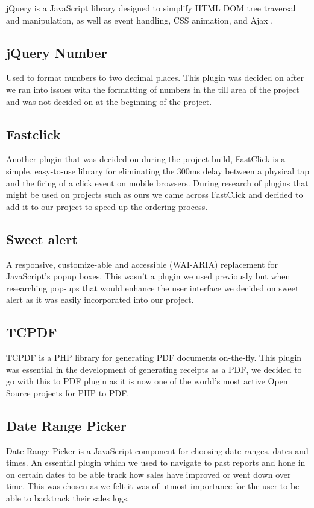 jQuery is a JavaScript library designed to simplify HTML DOM tree traversal and manipulation, as well as event handling, CSS animation, and Ajax \cite{JQ}. 
\subsection{jQuery Number}

Used to format numbers to two decimal places. This plugin was decided on after we ran into issues with the formatting of numbers in the till area of the project and was not decided on at the beginning of the project.

\subsection{Fastclick}

Another plugin that was decided on during the project build, FastClick is a simple, easy-to-use library for eliminating the 300ms delay between a physical tap and the firing of a click event on mobile browsers. During research of plugins that might be used on projects such as ours we came across FastClick and decided to add it to our project to speed up the ordering process.

\subsection{Sweet alert}

A responsive, customize-able and accessible (WAI-ARIA) replacement for JavaScript's popup boxes. This wasn’t a plugin we used previously but when researching pop-ups that would enhance the user interface we decided on sweet alert as it was easily incorporated into our project.

\subsection{TCPDF}

TCPDF is a PHP library for generating PDF documents on-the-fly. This plugin was essential in the development of generating receipts as a PDF, we decided to go with this to PDF plugin as it is now one of the world's most active Open Source projects for PHP to PDF.

\subsection{Date Range Picker}

Date Range Picker is a JavaScript component for choosing date ranges, dates and times. An essential plugin which we used to navigate to past reports and hone in on certain dates to be able track how sales have improved or went down over time. This was chosen as we felt it was of utmost importance for the user to be able to backtrack their sales logs.

